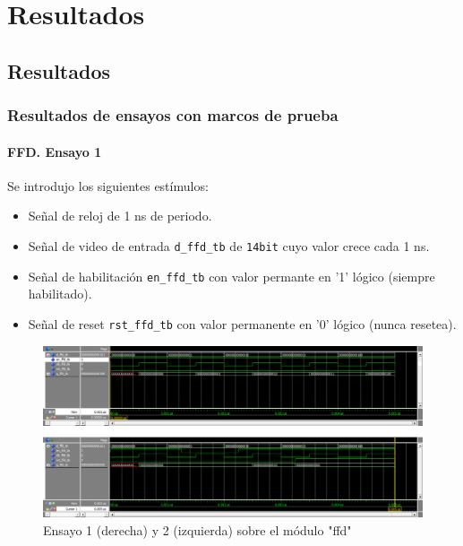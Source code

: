 
\chapter{Resultados} %

\label{Chapter4} %


\section{Resultados}
\label{sec: Resultados}

\subsection{Resultados de ensayos con marcos de prueba}

\subsubsection{FFD. Ensayo 1}

Se introdujo los siguientes estímulos:
\begin{itemize}
\item Señal de reloj de 1 ns de periodo.
\item Señal de video de entrada \texttt{d\_ffd\_tb} de \texttt{14\-bit} cuyo valor crece cada 1 ns.
\item Señal de habilitación \texttt{en\_ffd\_tb} con valor permante en '1' lógico (siempre habilitado).
\item Señal de reset \texttt{rst\_ffd\_tb} con valor permanente en '0' lógico (nunca resetea).
\end{itemize}

\begin{figure}
\centering
\includegraphics[scale=0.2, angle=270]{./Figures/tb_cfar_ffd.png}
\caption{Ensayo 1 (derecha) y 2 (izquierda) sobre el módulo "ffd"}
\label{tb_cfar_ffd}
\end{figure}

